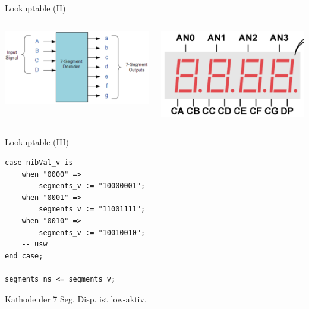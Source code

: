 \documentclass[aspectratio=169,presentation]{beamer}
\begin{document}
\begin{frame} {Lookuptable (II)}
	\begin{columns}
      \begin{center}
        \includegraphics[width=\textwidth]{figs/bcd_7seg.png}
      \end{center}
    \begin{center}
      \includegraphics[width=\textwidth]{figs/7seg_package.png}
    \end{center}
	\end{columns}
\end{frame}

\begin{frame} [fragile] {Lookuptable (III)}
	\begin{lstlisting}
case nibVal_v is
	when "0000" => 
		segments_v := "10000001";
	when "0001" => 
		segments_v := "11001111";
	when "0010" => 
		segments_v := "10010010";    
	-- usw
end case;

segments_ns <= segments_v;
  \end{lstlisting}
  \begin{alertblock} {}
    Kathode der 7 Seg. Disp. ist low-aktiv.
  \end{alertblock}
\end{frame}
\end{document}
